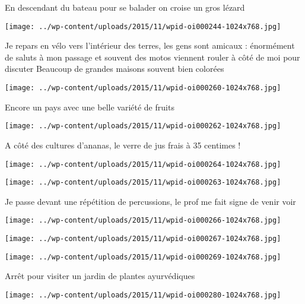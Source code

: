  En descendant du bateau pour se balader on croise un gros lézard \newline
 \newline
\centerline{\texttt{[image: ../wp-content/uploads/2015/11/wpid-oi000244-1024x768.jpg]} } 
 \newline
 Je repars en vélo vers l'intérieur des terres, les gens sont amicaux : énormément de saluts à mon passage et souvent des motos viennent rouler à côté de moi pour discuter \newline
 Beaucoup de grandes maisons souvent bien colorées \newline
 \newline
\centerline{\texttt{[image: ../wp-content/uploads/2015/11/wpid-oi000260-1024x768.jpg]} } 
 \newline
 Encore un pays avec une belle variété de fruits \newline
 \newline
\centerline{\texttt{[image: ../wp-content/uploads/2015/11/wpid-oi000262-1024x768.jpg]} } 
 \newline
 A côté des cultures d'ananas, le verre de jus frais à 35 centimes ! \newline
 \newline
\centerline{\texttt{[image: ../wp-content/uploads/2015/11/wpid-oi000264-1024x768.jpg]} } 
 \newline
 \newline
\centerline{\texttt{[image: ../wp-content/uploads/2015/11/wpid-oi000263-1024x768.jpg]} } 
 \newline
 Je passe devant une répétition de percussions, le prof me fait signe de venir voir \newline
 \newline
\centerline{\texttt{[image: ../wp-content/uploads/2015/11/wpid-oi000266-1024x768.jpg]} } 
 \newline
 \newline
\centerline{\texttt{[image: ../wp-content/uploads/2015/11/wpid-oi000267-1024x768.jpg]} } 
 \newline
 \newline
\centerline{\texttt{[image: ../wp-content/uploads/2015/11/wpid-oi000269-1024x768.jpg]} } 
 \newline
 Arrêt pour visiter un jardin de plantes ayurvédiques \newline
 \newline
\centerline{\texttt{[image: ../wp-content/uploads/2015/11/wpid-oi000280-1024x768.jpg]} } 
